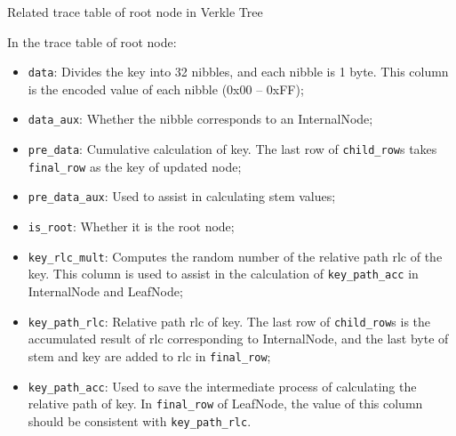 \begin{table}[!ht]
    \centering
    \caption{Related trace table of root node in Verkle Tree}
    \label{table:verkle-tree-key-constraints}
\end{table}

In the trace table of root node:
\begin{itemize}
    \item \verb|data|: Divides the key into 32 nibbles, and each nibble is 1 byte. This column is the encoded value of each nibble (0x00 -- 0xFF);
    \item \verb|data_aux|: Whether the nibble corresponds to an InternalNode;
    \item \verb|pre_data|: Cumulative calculation of key. The last row of \verb|child_row|s takes \verb|final_row| as the key of updated node;
    \item \verb|pre_data_aux|: Used to assist in calculating stem values;
    \item \verb|is_root|: Whether it is the root node;
    \item \verb|key_rlc_mult|: Computes the random number of the relative path rlc of the key. This column is used to assist in the calculation of \verb|key_path_acc| in InternalNode and LeafNode;
    \item \verb|key_path_rlc|: Relative path rlc of key. The last row of \verb|child_row|s is the accumulated result of rlc corresponding to InternalNode, and the last byte of stem and key are added to rlc in \verb|final_row|;
    \item \verb|key_path_acc|: Used to save the intermediate process of calculating the relative path of key. In \verb|final_row| of LeafNode, the value of this column should be consistent with \verb|key_path_rlc|.
\end{itemize}


